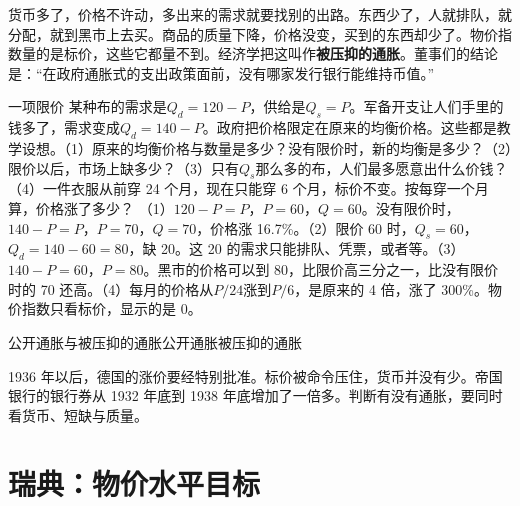 货币多了，价格不许动，多出来的需求就要找别的出路。东西少了，人就排队，就分配，就到黑市上去买。商品的质量下降，价格没变，买到的东西却少了。物价指数量的是标价，这些它都量不到。经济学把这叫作\textbf{被压抑的通胀}。董事们的结论是：“在政府通胀式的支出政策面前，没有哪家发行银行能维持币值。”\cite{nca1946g}

\begin{example}{一项限价}\label{ex:alternatives-ceiling}
某种布的需求是$Q_d=120-P$，供给是$Q_s=P$。军备开支让人们手里的钱多了，需求变成$Q_d=140-P$。政府把价格限定在原来的均衡价格。这些都是教学设想。（1）原来的均衡价格与数量是多少？没有限价时，新的均衡是多少？（2）限价以后，市场上缺多少？（3）只有$Q_s$那么多的布，人们最多愿意出什么价钱？（4）一件衣服从前穿 24 个月，现在只能穿 6 个月，标价不变。按每穿一个月算，价格涨了多少？
\solution （1）$120-P=P$，$P=60$，$Q=60$。没有限价时，$140-P=P$，$P=70$，$Q=70$，价格涨 16.7\%。（2）限价 60 时，$Q_s=60$，$Q_d=140-60=80$，缺 20。这 20 的需求只能排队、凭票，或者等。（3）$140-P=60$，$P=80$。黑市的价格可以到 80，比限价高三分之一，比没有限价时的 70 还高。（4）每月的价格从$P/24$涨到$P/6$，是原来的 4 倍，涨了 300\%。物价指数只看标价，显示的是 0。
\end{example}

\begin{compare}{公开通胀与被压抑的通胀}{公开通胀}{被压抑的通胀}
\end{compare}

\begin{pitfall}
1936 年以后，德国的涨价要经特别批准\cite{bis1937}。标价被命令压住，货币并没有少。帝国银行的银行券从 1932 年底到 1938 年底增加了一倍多\cite{bms1943}。判断有没有通胀，要同时看货币、短缺与质量。
\end{pitfall}

\section{瑞典：物价水平目标}\label{sec:alternatives-sweden}

